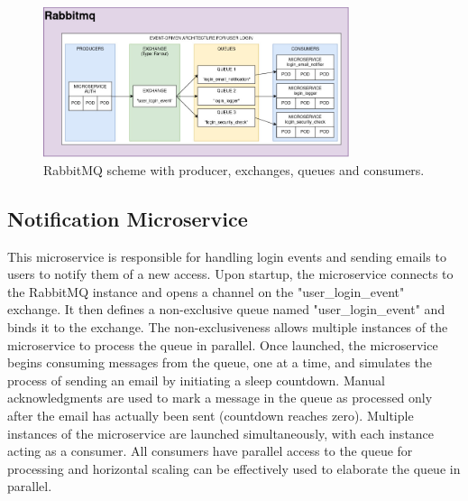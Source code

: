 \documentclass[manuscript,screen,review]{acmart}
\begin{document}
\begin{figure}[h]
  \centering
  \includegraphics[width=0.8\textwidth]{Images/RabbitMQ.jpg}
  \caption{RabbitMQ scheme with producer, exchanges, queues and consumers.}
\end{figure}

\subsection{Notification Microservice}
This microservice is responsible for handling login events and sending emails to users to notify them of a new access. Upon startup, the microservice connects to the RabbitMQ instance and opens a channel on the "user\_login\_event" exchange. It then defines a non-exclusive queue named "user\_login\_event" and binds it to the exchange. The non-exclusiveness allows multiple instances of the microservice to process the queue in parallel.
Once launched, the microservice begins consuming messages from the queue, one at a time, and simulates the process of sending an email by initiating a sleep countdown. Manual acknowledgments are used to mark a message in the queue as processed only after the email has actually been sent (countdown reaches zero).
Multiple instances of the microservice are launched simultaneously, with each instance acting as a consumer. All consumers have parallel access to the queue for processing and horizontal scaling can be effectively used to elaborate the queue in parallel.
\end{document}
